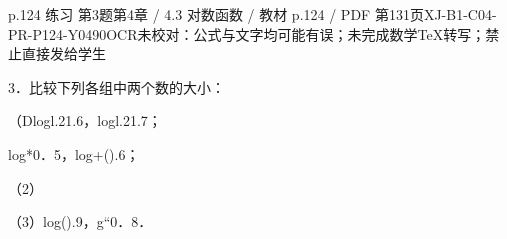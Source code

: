 \begin{bankitem}{p.124 练习 第3题}{第4章 / 4.3 对数函数 / 教材 p.124 / PDF 第131页}{XJ-B1-C04-PR-P124-Y0490}{OCR未校对：公式与文字均可能有误；未完成数学TeX转写；禁止直接发给学生}
\begin{ocrdraft}
\par
3．比较下列各组中两个数的大小：
\par
（Dlogl.21.6，logl.21.7；
\par
log*0．5，log+().6；
\par
（2）
\par
（3）log().9，g“0．8．
\end{ocrdraft}
\end{bankitem}
